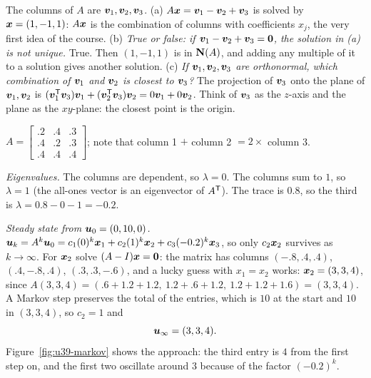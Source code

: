 \begin{example}[Columns $\vb{v}_1,\vb{v}_2,\vb{v}_3$]\label{ex:u39-columns}
The columns of $A$ are $\vb{v}_1,\vb{v}_2,\vb{v}_3$.
(a) $A\boldsymbol{x}=\boldsymbol{v}_1-\boldsymbol{v}_2+\boldsymbol{v}_3$ is solved by $\boldsymbol{x}=(1,-1,1)$: $A\boldsymbol{x}$ is the combination of columns with coefficients $x_j$, the very first idea of the course.
(b) \emph{True or false: if $\boldsymbol{v}_1-\boldsymbol{v}_2+\boldsymbol{v}_3=\boldsymbol{0}$, the solution in (a) is not unique.} True. Then $(1,-1,1)$ is in $\mathbf{N}(A)$, and adding any multiple of it to a solution gives another solution.
(c) \emph{If $\vb{v}_1,\vb{v}_2,\vb{v}_3$ are orthonormal, which combination of $\boldsymbol{v}_1$ and $\boldsymbol{v}_2$ is closest to $\boldsymbol{v}_3$?} The projection of $\boldsymbol{v}_3$ onto the plane of $\boldsymbol{v}_1,\boldsymbol{v}_2$ is $(\boldsymbol{v}_1^{\mathsf{T}}\boldsymbol{v}_3)\boldsymbol{v}_1+(\boldsymbol{v}_2^{\mathsf{T}}\boldsymbol{v}_3)\boldsymbol{v}_2=0\boldsymbol{v}_1+0\boldsymbol{v}_2$. Think of $\boldsymbol{v}_3$ as the $z$-axis and the plane as the $xy$-plane: the closest point is the origin.
\end{example}

\begin{example}\label{ex:u39-markov}
$A=\begin{bmatrix}.2&.4&.3\\.4&.2&.3\\.4&.4&.4\end{bmatrix}$; note that column 1 $+$ column 2 $=2\times$ column 3.

\emph{Eigenvalues.} The columns are dependent, so $\lambda=0$. The columns sum to $1$, so $\lambda=1$ (the all-ones vector is an eigenvector of $A^{\mathsf{T}}$). The trace is $0.8$, so the third is $\lambda=0.8-0-1=-0.2$.

\emph{Steady state from $\boldsymbol{u}_0=(0,10,0)$.} $\boldsymbol{u}_k=A^{k}\boldsymbol{u}_0=c_1(0)^{k}\boldsymbol{x}_1+c_2(1)^{k}\boldsymbol{x}_2+c_3(-0.2)^{k}\boldsymbol{x}_3$, so only $c_2\boldsymbol{x}_2$ survives as $k\to\infty$. For $\boldsymbol{x}_2$ solve $(A-I)\boldsymbol{x}=\boldsymbol{0}$: the matrix has columns $(-.8,.4,.4)$, $(.4,-.8,.4)$, $(.3,.3,-.6)$, and a lucky guess with $x_1=x_2$ works: $\boldsymbol{x}_2=(3,3,4)$, since $A(3,3,4)=(.6+1.2+1.2,\ 1.2+.6+1.2,\ 1.2+1.2+1.6)=(3,3,4)$. A Markov step preserves the total of the entries, which is $10$ at the start and $10$ in $(3,3,4)$, so $c_2=1$ and
\[
\boldsymbol{u}_\infty=(3,3,4).
\]
Figure~\ref{fig:u39-markov} shows the approach: the third entry is $4$ from the first step on, and the first two oscillate around $3$ because of the factor $(-0.2)^{k}$.
\end{example}

